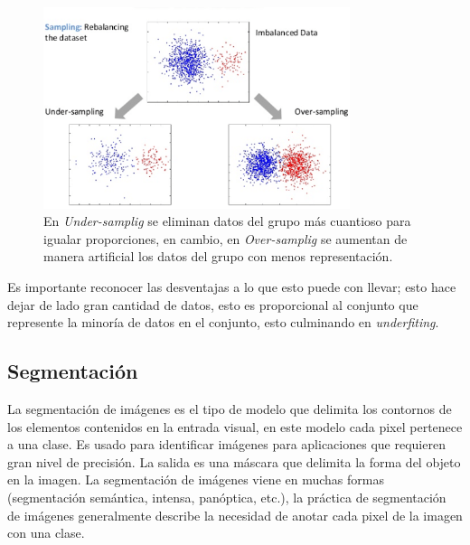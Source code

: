 \documentclass[letter,12pt]{report}
\begin{document}
\begin{figure}[H]
    \centering
    \includegraphics[width=0.8\textwidth]{balance}
    \caption{En \textit{Under-samplig} se eliminan datos del grupo más cuantioso para
    igualar proporciones, en cambio, en \textit{Over-samplig} se aumentan de manera
artificial los datos del grupo con menos representación.}
    \label{fig:balance}
\end{figure}

Es importante reconocer las desventajas a lo que esto puede con llevar; esto hace dejar
de lado gran cantidad de datos, esto es proporcional al conjunto que represente la
minoría de datos en el conjunto, esto culminando en \textit{underfiting}.

\subsection{Segmentación}
La segmentación \cite{Segmenta} de imágenes es el tipo de modelo que delimita los
contornos de los elementos contenidos en la entrada visual, en este modelo cada pixel
pertenece a una clase. Es usado para identificar imágenes para aplicaciones que requieren
gran nivel de precisión. La salida es una máscara que delimita la forma del objeto en la
imagen. La segmentación de imágenes viene en muchas formas (segmentación semántica,
intensa, panóptica, etc.), la práctica de segmentación de imágenes generalmente describe
la necesidad de anotar cada pixel de la imagen con una clase.
\end{document}
